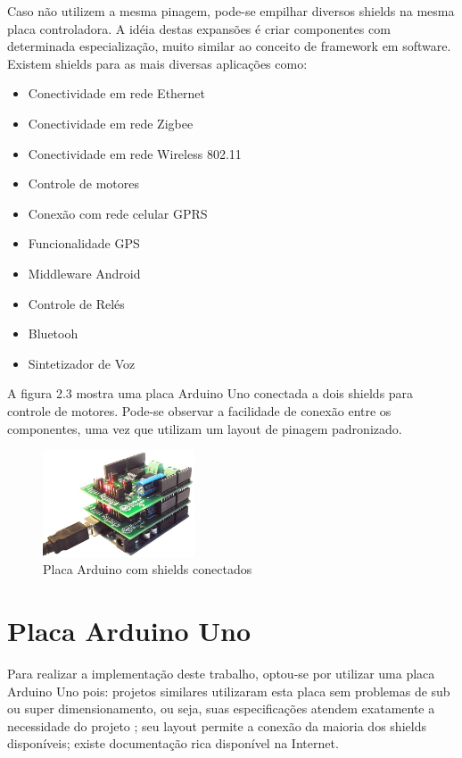 Caso não utilizem a mesma pinagem, pode-se empilhar diversos shields na mesma placa controladora. A idéia destas expansões é criar componentes com determinada especialização, muito similar ao conceito de framework em software. Existem shields para as mais diversas aplicações como:

\begin{itemize}
	\item Conectividade em rede Ethernet
	\item Conectividade em rede Zigbee
	\item Conectividade em rede Wireless 802.11
	\item Controle de motores
	\item Conexão com rede celular GPRS
	\item Funcionalidade GPS
	\item Middleware Android
	\item Controle de Relés
	\item Bluetooh
	\item Sintetizador de Voz
\end{itemize}

A figura 2.3 mostra uma placa Arduino Uno conectada a dois shields para controle de motores. Pode-se observar a facilidade de conexão entre os componentes, uma vez que utilizam um layout de pinagem padronizado.

\begin{figure}[h!]
			\centering
			\includegraphics[width=0.4\textwidth]{figures/arduino_with_shield.jpg}
			\caption{Placa Arduino com shields conectados}
			\label{1}
\end{figure}

\section {Placa Arduino Uno}

Para realizar a implementação deste trabalho, optou-se por utilizar uma placa Arduino Uno pois: projetos similares utilizaram esta placa sem problemas de sub ou super dimensionamento, ou seja, suas especificações atendem exatamente a necessidade do projeto ; seu layout permite a conexão da maioria dos shields disponíveis; existe documentação rica disponível na Internet.

